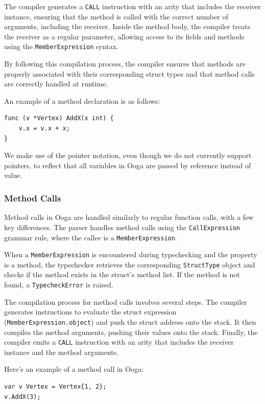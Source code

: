 \documentclass{report}
\begin{document}
The compiler generates a \texttt{CALL} instruction with an arity that includes the receiver instance, ensuring that the method is called with the correct number of arguments, including the receiver. Inside the method body, the compiler treats the receiver as a regular parameter, allowing access to its fields and methods using the \texttt{MemberExpression} syntax.

By following this compilation process, the compiler ensures that methods are properly associated with their corresponding struct types and that method calls are correctly handled at runtime.

An example of a method declaration is as follows:

\begin{verbatim}
func (v *Vertex) AddX(x int) {
    v.x = v.x + x;
}
\end{verbatim}

We make use of the pointer notation, even though we do not currently support pointers, to reflect that all variables in Ooga are passed by reference instead of value.

\subsubsection{Method Calls}

Method calls in Ooga are handled similarly to regular function calls, with a few key differences. The parser handles method calls using the \texttt{CallExpression} grammar rule, where the callee is a \texttt{MemberExpression}.

When a \texttt{MemberExpression} is encountered during typechecking and the property is a method, the typechecker retrieves the corresponding \texttt{StructType} object and checks if the method exists in the struct's method list. If the method is not found, a \texttt{TypecheckError} is raised.

The compilation process for method calls involves several steps. The compiler generates instructions to evaluate the struct expression (\texttt{MemberExpression.object}) and push the struct address onto the stack. It then compiles the method arguments, pushing their values onto the stack. Finally, the compiler emits a \texttt{CALL} instruction with an arity that includes the receiver instance and the method arguments.

Here's an example of a method call in Ooga:

\begin{verbatim}
var v Vertex = Vertex{1, 2};
v.AddX(3);
\end{verbatim}
\end{document}
